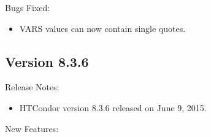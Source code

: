 \noindent Bugs Fixed:

\begin{itemize}

\item {} VARS values can now contain single quotes.

\end{itemize}

\subsection*{\label{sec:New-8-3-6}Version 8.3.6}

\noindent Release Notes:

\begin{itemize}

\item HTCondor version 8.3.6 released on June 9, 2015.

\end{itemize}


\noindent New Features:

